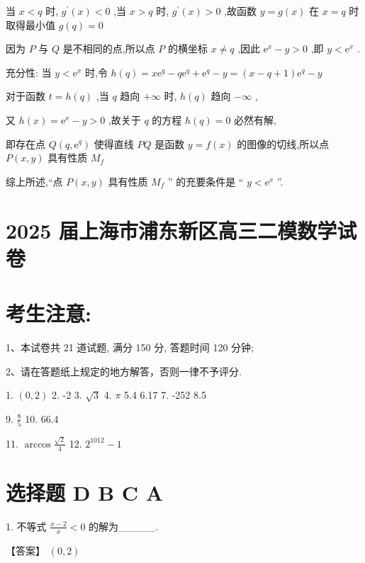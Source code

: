\documentclass[10pt]{article}
\begin{document}
当 \(x < q\) 时, \({g}^{\prime }\left( x\right)  < 0\) ,当 \(x > q\) 时, \({g}^{\prime }\left( x\right)  > 0\) ,故函数 \(y = g\left( x\right)\) 在 \(x = q\) 时取得最小值 \(g\left( q\right)  = 0\)

因为 \(P\) 与 \(Q\) 是不相同的点,所以点 \(P\) 的横坐标 \(x \neq  q\) ,因此 \({\mathrm{e}}^{x} - y > 0\) ,即 \(y < {\mathrm{e}}^{x}\) .

充分性: 当 \(y < {\mathrm{e}}^{x}\) 时,令 \(h\left( q\right)  = x{\mathrm{e}}^{q} - q{\mathrm{e}}^{q} + {\mathrm{e}}^{q} - y = \left( {x - q + 1}\right) {\mathrm{e}}^{q} - y\)

对于函数 \(t = h\left( q\right)\) ,当 \(q\) 趋向 \(+ \infty\) 时, \(h\left( q\right)\) 趋向 \(- \infty\) ,

又 \(h\left( x\right)  = {\mathrm{e}}^{x} - y > 0\) ,故关于 \(q\) 的方程 \(h\left( q\right)  = 0\) 必然有解,

即存在点 \(Q\left( {q,{\mathrm{e}}^{q}}\right)\) 使得直线 \({PQ}\) 是函数 \(y = f\left( x\right)\) 的图像的切线,所以点 \(P\left( {x,y}\right)\) 具有性质 \({M}_{f}\)

综上所述,“点 \(P\left( {x,y}\right)\) 具有性质 \({M}_{f}\) ” 的充要条件是 “ \(y < {\mathrm{e}}^{x}\) ”.

\section*{2025 届上海市浦东新区高三二模数学试卷}

\section*{考生注意:}

1、本试卷共 21 道试题, 满分 150 分, 答题时间 120 分钟;

2、请在答题纸上规定的地方解答，否则一律不予评分.

1. \(\left( {0,2}\right)\) 2. -2 3. \(\sqrt{3}\) 4. \(\pi\) 5.4 6.17 7. -252 8.5

9. \(\frac{8}{5}\) 10. 66.4

11. \(\arccos \frac{\sqrt{2}}{4}\) 12. \({2}^{1012} - 1\)

\section*{选择题 D B C A}

1. 不等式 \(\frac{x - 2}{x} < 0\) 的解为\_\_\_\_\_.

【答案】 \(\left( {0,2}\right)\)
\end{document}

